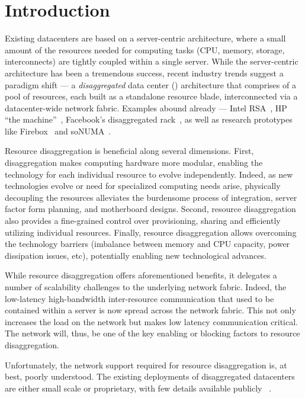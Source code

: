 \vspace{-0.1in}
\section{Introduction}
\vspace{-0.05in}
\label{sec:intro}
Existing datacenters are based on a server-centric architecture, where a small amount of the resources needed for computing tasks (CPU, memory, storage, interconnects) are tightly coupled within a single server. While the server-centric architecture has been a tremendous success, recent industry trends suggest a paradigm shift --- a {\em disaggregated} data center (\dis) architecture that comprises of a pool of resources, each built as a standalone resource blade, interconnected via a datacenter-wide network fabric. Examples abound already --- Intel RSA~\cite{rsa}, HP ``the machine''~\cite{hptm}, Facebook's disaggregated rack~\cite{fdr}, as well as research prototypes like Firebox~\cite{firebox} and soNUMA~\cite{sonuma}.

Resource disaggregation is beneficial along several dimensions. First, disaggregation makes computing hardware more modular, enabling the technology for each individual resource to evolve independently. Indeed, as new technologies evolve or need for specialized computing needs arise, physically decoupling the resources alleviates the burdensome process of integration, server factor form planning, and motherboard designs. Second, resource disaggregation also provides a fine-grained control over provisioning, sharing and efficiently utilizing individual resources. Finally, resource disaggregation allows overcoming the technology barriers (imbalance between memory and CPU capacity, power dissipation issues, etc), potentially enabling new technological advances. 

While resource disaggregation offers aforementioned benefits, it delegates a number of scalability challenges to the underlying network fabric. Indeed, the low-latency high-bandwidth inter-resource communication that used to be contained within a server is now spread across the network fabric. This not only increases the load on the network but makes low latency communication critical. The network will, thus, be one of the key enabling or blocking factors to resource disaggregation. 

Unfortunately, the network support required for resource disaggregation is, at best, poorly understood. The existing deployments of disaggregated datacenters are either small scale or proprietary, with few details available publicly~\cite{x1, x2, x3, x4} .

